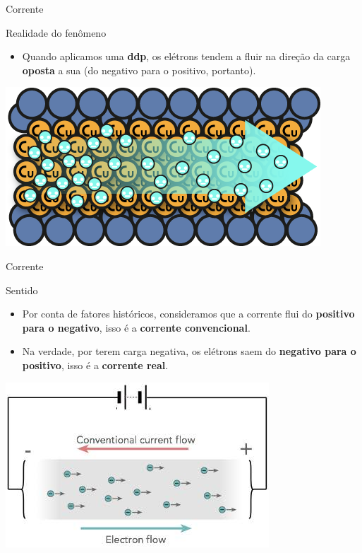 \begin{frame}{Corrente}
	\begin{block}{Realidade do fenômeno}
		\begin{itemize}
			\item Quando aplicamos uma \textbf{ddp}, os elétrons tendem a fluir na direção da carga \textbf{oposta} a sua (do negativo para o positivo, portanto).
		\end{itemize}
	\end{block}

	\bigskip

	\centering
	\includegraphics[width=0.65\linewidth]{Figuras/Ch01/fig8.2}

\end{frame}


\begin{frame}{Corrente}
	\begin{block}{Sentido}
		\begin{itemize}
			\item Por conta de fatores históricos, consideramos que a corrente flui do \textbf{positivo para o negativo}, isso é a \textbf{corrente convencional}.
			\item Na verdade, por terem carga negativa, os elétrons saem do \textbf{negativo para o positivo}, isso é a \textbf{corrente real}.
		\end{itemize}
	\end{block}

	\centering
	\includegraphics[width=0.65\linewidth]{Figuras/Ch01/fig8}

\end{frame}


